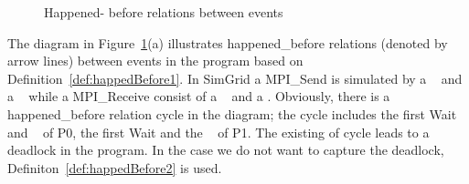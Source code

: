 \documentclass[a4paper,11pt]{article}
\begin{document}
 \begin{figure}[H]
\label{fig:hapend_before}
\hfill
{}
\caption{Happened- before relations between events}
\end{figure}

The diagram in Figure~\ref{fig:hapend_before}(a) illustrates happened\_before relations (denoted by arrow lines) between events in the program based on Definition~\ref{def:happedBefore1}. In SimGrid a MPI\_Send is simulated by a \asynsend~ and a \wait~ while a MPI\_Receive consist of a \asynreceive~ and a \wait. Obviously, there is a happened\_before relation cycle in the diagram; the cycle includes the first Wait and \asynreceive~ of P0, the first Wait and the \asynreceive~ of P1. The existing of cycle leads to a deadlock in the program. In the case we do not want to capture the deadlock, Definiton~\ref{def:happedBefore2} is used.
\end{document}
